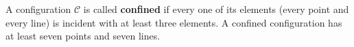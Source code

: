 A configuration $\mathcal{C}$ is called \textbf{confined} if every one of its elements (every point and every line) is incident with at least three elements. A confined configuration has at least seven points and seven lines.
